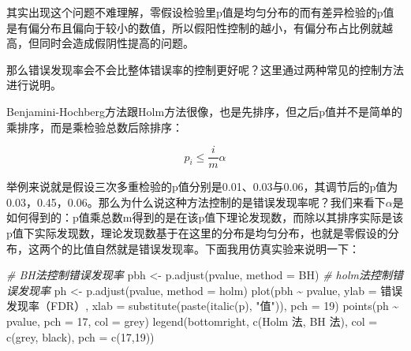 \documentclass[]{tufte-book}
\newenvironment{Shaded}{}{}
\newcommand{\AttributeTok}[1]{\textcolor[rgb]{0.49,0.56,0.16}{#1}}
\newcommand{\CommentTok}[1]{\textcolor[rgb]{0.38,0.63,0.69}{\textit{#1}}}
\newcommand{\DecValTok}[1]{\textcolor[rgb]{0.25,0.63,0.44}{#1}}
\newcommand{\FunctionTok}[1]{\textcolor[rgb]{0.02,0.16,0.49}{#1}}
\newcommand{\NormalTok}[1]{#1}
\newcommand{\OtherTok}[1]{\textcolor[rgb]{0.00,0.44,0.13}{#1}}
\newcommand{\SpecialCharTok}[1]{\textcolor[rgb]{0.25,0.44,0.63}{#1}}
\newcommand{\StringTok}[1]{\textcolor[rgb]{0.25,0.44,0.63}{#1}}
\begin{document}
其实出现这个问题不难理解，零假设检验里p值是均匀分布的而有差异检验的p值是有偏分布且偏向于较小的数值，所以假阳性控制的越小，有偏分布占比例就越高，但同时会造成假阴性提高的问题。

那么错误发现率会不会比整体错误率的控制更好呢？这里通过两种常见的控制方法进行说明。

Benjamini-Hochberg方法跟Holm方法很像，也是先排序，但之后p值并不是简单的乘排序，而是乘检验总数后除排序：

\[
p_i \leq \frac{i}{m} \alpha
\]

举例来说就是假设三次多重检验的p值分别是0.01、0.03与0.06，其调节后的p值为0.03，0.45，0.06。那么为什么说这种方法控制的是错误发现率呢？我们来看下\(\alpha\)是如何得到的：p值乘总数m得到的是在该p值下理论发现数，而除以其排序实际是该p值下实际发现数，理论发现数基于在这里的分布是均匀分布，也就是零假设的分布，这两个的比值自然就是错误发现率。下面我用仿真实验来说明一下：

\begin{Shaded}
\begin{Highlighting}[]
\CommentTok{\# BH法控制错误发现率}
\NormalTok{pbh }\OtherTok{\textless{}{-}} \FunctionTok{p.adjust}\NormalTok{(pvalue, }\AttributeTok{method =} \StringTok{\textquotesingle{}BH\textquotesingle{}}\NormalTok{)}
\CommentTok{\# holm法控制错误发现率}
\NormalTok{ph }\OtherTok{\textless{}{-}} \FunctionTok{p.adjust}\NormalTok{(pvalue, }\AttributeTok{method =} \StringTok{\textquotesingle{}holm\textquotesingle{}}\NormalTok{)}
\FunctionTok{plot}\NormalTok{(pbh }\SpecialCharTok{\textasciitilde{}}\NormalTok{ pvalue,}
     \AttributeTok{ylab =} \StringTok{\textquotesingle{}错误发现率（FDR）\textquotesingle{}}\NormalTok{,}
     \AttributeTok{xlab =} \FunctionTok{substitute}\NormalTok{(}\FunctionTok{paste}\NormalTok{(}\FunctionTok{italic}\NormalTok{(}\StringTok{\textquotesingle{}p\textquotesingle{}}\NormalTok{), }\StringTok{"值"}\NormalTok{)),}
     \AttributeTok{pch =} \DecValTok{19}\NormalTok{)}
\FunctionTok{points}\NormalTok{(ph }\SpecialCharTok{\textasciitilde{}}\NormalTok{ pvalue, }\AttributeTok{pch =} \DecValTok{17}\NormalTok{, }\AttributeTok{col =} \StringTok{\textquotesingle{}grey\textquotesingle{}}\NormalTok{)}
\FunctionTok{legend}\NormalTok{(}\StringTok{\textquotesingle{}bottomright\textquotesingle{}}\NormalTok{,}
       \FunctionTok{c}\NormalTok{(}\StringTok{\textquotesingle{}Holm 法\textquotesingle{}}\NormalTok{, }\StringTok{\textquotesingle{}BH 法\textquotesingle{}}\NormalTok{),}
       \AttributeTok{col =} \FunctionTok{c}\NormalTok{(}\StringTok{\textquotesingle{}grey\textquotesingle{}}\NormalTok{, }\StringTok{\textquotesingle{}black\textquotesingle{}}\NormalTok{),}
       \AttributeTok{pch =} \FunctionTok{c}\NormalTok{(}\DecValTok{17}\NormalTok{,}\DecValTok{19}\NormalTok{))}
\end{Highlighting}
\end{Shaded}
\end{document}
